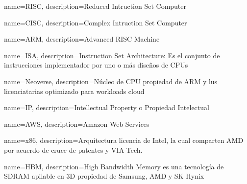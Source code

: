 \makeglossaries

{
    name={RISC},
    description={Reduced Intruction Set Computer}
}

{
    name={CISC},
    description={Complex Intruction Set Computer}
}

{
    name={ARM},
    description={Advanced RISC Machine}
}

{
    name={ISA},
    description={Instruction Set Architecture: Es el conjunto de instrucciones implementador por uno o más diseños de CPUs}
}

{
    name={Neoverse},
    description={Núcleo de CPU propiedad de ARM y lus licenciatarias optimizado para workloads cloud}
}

{
    name={IP},
    description={Intellectual Property o Propiedad Intelectual}
}

{
    name={AWS},
    description={Amazon Web Services}
}

{
    name={x86},
    description={Arquitectura licencia de Intel, la cual comparten AMD por acuerdo de cruce de patentes y VIA Tech.}
}

{
    name={HBM},
    description={High Bandwidth Memory es una tecnología de SDRAM apilable en 3D propiedad de Samsung, AMD y SK Hynix}
}